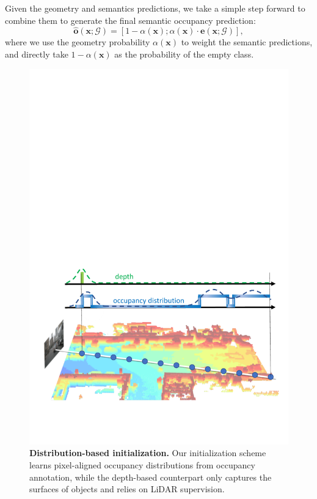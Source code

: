 Given the geometry and semantics predictions, we take a simple step forward to combine them to generate the final semantic occupancy prediction:
\begin{equation}
    \hat{\mathbf{o}}(\mathbf{x};\mathcal{G}) = [1-\alpha(\mathbf{x}); \alpha(\mathbf{x})\cdot\mathbf{e}(\mathbf{x};\mathcal{G})],
    \label{eq: final occ}
\end{equation}
where we use the geometry probability $\alpha(\mathbf{x})$ to weight the semantic predictions, and directly take $1 - \alpha(\mathbf{x})$ as the probability of the empty class.

\begin{figure}[t]
\centering
\includegraphics[width=0.95\linewidth]{figures/initialization.pdf}
\vspace{-2mm}
\caption{\textbf{Distribution-based initialization.}
Our initialization scheme learns pixel-aligned occupancy distributions from occupancy annotation, while the depth-based counterpart only captures the surfaces of objects and relies on LiDAR supervision.
}
\label{fig:initialization}
\vspace{-6mm}
\end{figure}

